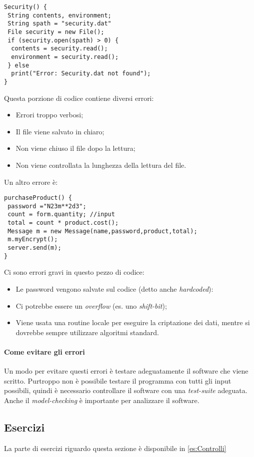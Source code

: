 \begin{verbatim}
Security() {
 String contents, environment;
 String spath = "security.dat"
 File security = new File();
 if (security.open(spath) > 0) {
  contents = security.read();
  environment = security.read();
 } else
  print("Error: Security.dat not found");
}
\end{verbatim}

Questa porzione di codice contiene diversi errori:
\begin{itemize}
\item Errori troppo verbosi;
\item Il file viene salvato in chiaro;
\item Non viene chiuso il file dopo la lettura;
\item Non viene controllata la lunghezza della lettura del file.
\end{itemize}

Un altro errore è:
\begin{verbatim}
purchaseProduct() {
 password ="N23m**2d3";
 count = form.quantity; //input
 total = count * product.cost();
 Message m = new Message(name,password,product,total);
 m.myEncrypt();
 server.send(m);
}
\end{verbatim}

Ci sono errori gravi in questo pezzo di codice:
\begin{itemize}
\item Le password vengono salvate sul codice (detto anche \textit{hardcoded}):
\item Ci potrebbe essere un \textit{overflow} (es. uno \textit{shift-bit});
\item Viene usata una routine locale per eseguire la criptazione dei dati, 
mentre si dovrebbe sempre utilizzare algoritmi standard.
\end{itemize}


\paragraph*{Come evitare gli errori} Un modo per evitare questi errori è 
testare adeguatamente il software che viene scritto. Purtroppo non è possibile 
testare il programma con tutti gli input possibili, quindi è necessario 
controllare il software con una \textit{test-suite} adeguata. 
Anche il \textit{model-checking} è importante per analizzare il software.

\subsection{Esercizi}

La parte di esercizi riguardo questa sezione è disponibile in \ref{es:Controlli}







